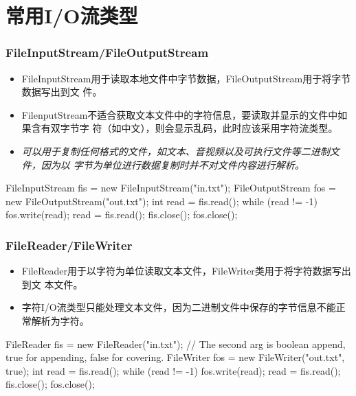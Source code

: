 \section{常用I/O流类型}

\begin{frame}[fragile] %
\frametitle{FileInputStream/FileOutputStream}
\begin{itemize}
\item FileInputStream用于读取本地文件中字节数据，FileOutputStream用于将字节数据写出到文
  件。
\item FilenputStream不适合获取文本文件中的字符信息，要读取并显示的文件中如果含有双字节字
  符（如中文），则会显示乱码，此时应该采用字符流类型。
\item {\Red \it 可以用于复制任何格式的文件，如文本、音视频以及可执行文件等二进制文件，因为以
    字节为单位进行数据复制时并不对文件内容进行解析。}
\end{itemize}
\begin{javaCode}
FileInputStream fis = new FileInputStream("in.txt");
FileOutputStream fos = new FileOutputStream("out.txt");
int read = fis.read();
while (read != -1) {
  fos.write(read);
  read = fis.read();
} 
fis.close();
fos.close();
\end{javaCode}
\end{frame}

\begin{frame}[fragile] %
\frametitle{FileReader/FileWriter}
\begin{itemize}
\item FileReader用于以{\hei 字符}为单位读取文本文件，FileWriter类用于将字符数据写出到文
  本文件。
\item 字符I/O流类型只能处理文本文件，因为二进制文件中保存的字节信息不能正常解析为字符。
\end{itemize}
\begin{javaCode}
FileReader fis = new FileReader("in.txt");
// The second arg is boolean append, true for appending, false for covering.
FileWriter fos = new FileWriter("out.txt", true); 
int read = fis.read();
while (read != -1) {
  fos.write(read);
  read = fis.read();
} 
fis.close();
fos.close();
\end{javaCode}
\end{frame}

